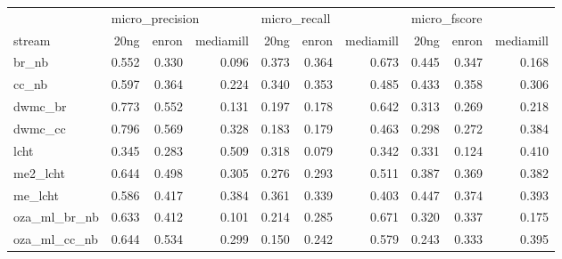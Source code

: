 \begin{tabular}{lrrrrrrrrr}
	\toprule
	                & \multicolumn{3}{l}{micro\_precision} & \multicolumn{3}{l}{micro\_recall} & \multicolumn{3}{l}{micro\_fscore}                                                         \\
	stream          & 20ng                                 & enron                             & mediamill                         & 20ng  & enron & mediamill & 20ng  & enron & mediamill \\
	\midrule
	br\_nb          & 0.552                                & 0.330                             & 0.096                             & 0.373 & 0.364 & 0.673     & 0.445 & 0.347 & 0.168     \\
	cc\_nb          & 0.597                                & 0.364                             & 0.224                             & 0.340 & 0.353 & 0.485     & 0.433 & 0.358 & 0.306     \\
	dwmc\_br        & 0.773                                & 0.552                             & 0.131                             & 0.197 & 0.178 & 0.642     & 0.313 & 0.269 & 0.218     \\
	dwmc\_cc        & 0.796                                & 0.569                             & 0.328                             & 0.183 & 0.179 & 0.463     & 0.298 & 0.272 & 0.384     \\
	lcht            & 0.345                                & 0.283                             & 0.509                             & 0.318 & 0.079 & 0.342     & 0.331 & 0.124 & 0.410     \\
	me2\_lcht       & 0.644                                & 0.498                             & 0.305                             & 0.276 & 0.293 & 0.511     & 0.387 & 0.369 & 0.382     \\
	me\_lcht        & 0.586                                & 0.417                             & 0.384                             & 0.361 & 0.339 & 0.403     & 0.447 & 0.374 & 0.393     \\
	oza\_ml\_br\_nb & 0.633                                & 0.412                             & 0.101                             & 0.214 & 0.285 & 0.671     & 0.320 & 0.337 & 0.175     \\
	oza\_ml\_cc\_nb & 0.644                                & 0.534                             & 0.299                             & 0.150 & 0.242 & 0.579     & 0.243 & 0.333 & 0.395     \\
	\bottomrule
\end{tabular}
